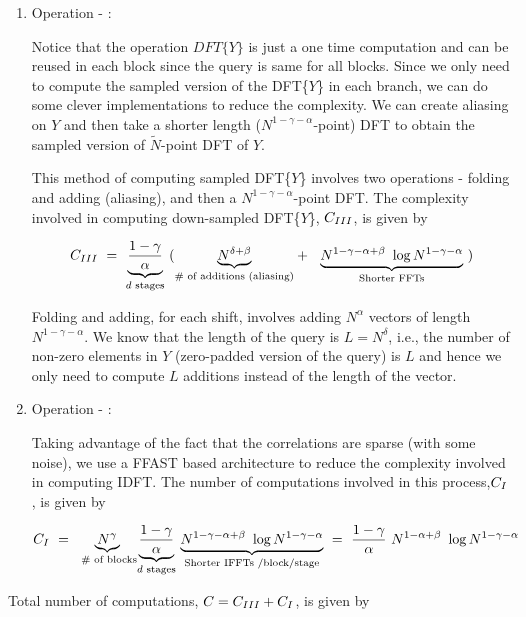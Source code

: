 \begin{enumerate}
	\item  Operation - : 
	
	Notice that the operation $ DFT \{ Y \} $ is just a one time computation and can be reused in each block since the query is same for all blocks.
	Since we only need to compute the sampled version of the DFT\{$Y$\} in each branch, we can do some clever implementations to reduce the complexity. We can create aliasing on $Y$ and then take a shorter length ($N^{1-\gamma-\alpha}$-point) DFT to obtain the sampled version of $\tilde{N}$-point DFT of $Y$.
	
	This method of computing sampled DFT\{$Y$\} involves two operations - folding and adding (aliasing), and then a $N^{1-\gamma-\alpha}$-point DFT. The complexity involved in computing down-sampled DFT\{$Y$\}, $C_{\RNum{3}}$, is given by
	
	 \[ C_{\RNum{3}} \ = \  \underset{\text{$d$ stages} }{\underbrace{\frac{1-\gamma}{\alpha}}} \
	  ( \underset{\text{\# of additions (aliasing)} }{\underbrace{N^{\delta+\beta}}} + \ \
	  \underset{\text{Shorter FFTs} }{\underbrace{N^{1-\gamma-\alpha+\beta} \ \log N^{1-\gamma-\alpha}}} \ )  
	 \]
	
	Folding and adding, for each shift, involves adding $N^{\alpha}$ vectors of length $N^{1-\gamma-\alpha}$. We know that the length of the query is $L =N^{\delta}$, i.e., the number of non-zero elements in $Y$ (zero-padded version of the query) is $L$ and hence we only need to compute $L$ additions instead of the length of the vector.
	
	\item  Operation - \RNum{1}:
	
	Taking advantage of the fact that the correlations are sparse (with some noise), we use a FFAST based architecture to reduce the complexity involved in computing IDFT. The number of computations involved in this process,$C_{\RNum{1}}$, is given by
	
	 \[C_{\RNum{1}} \ = \ \underset{\text{ \# of blocks} }{\underbrace{N^{\gamma}}} \underset{\text{$d$ stages} }{\underbrace{\frac{1-\gamma}{\alpha}}} \
	 \underset{\text{Shorter IFFTs /block/stage} }{\underbrace{N^{1-\gamma-\alpha+\beta} \ \log N^{1-\gamma-\alpha}}} 
	 \ = \  \frac{1-\gamma}{\alpha} \ N^{1-\alpha+\beta} \ \log N^{1-\gamma-\alpha} 
	 \]    
\end{enumerate}

Total number of computations, $C = C_{\RNum{3}}+C_{\RNum{1}} $, is given by

